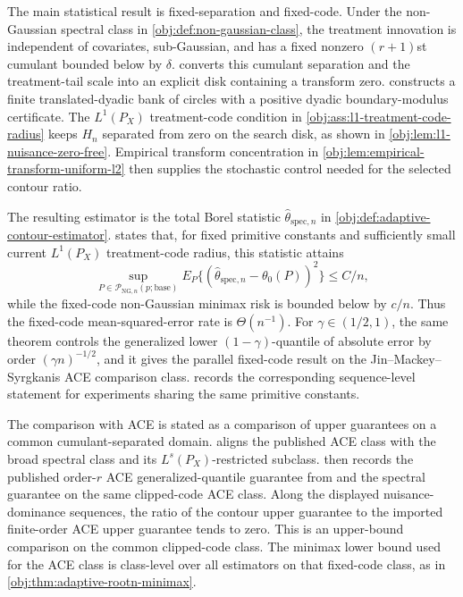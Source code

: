 The main statistical result is fixed-separation and fixed-code. Under the non-Gaussian spectral class in \cref{obj:def:non-gaussian-class}, the treatment innovation is independent of covariates, sub-Gaussian, and has a fixed nonzero \((r+1)\)st cumulant bounded below by \(\delta\).  converts this cumulant separation and the treatment-tail scale into an explicit disk containing a transform zero.  constructs a finite translated-dyadic bank of circles with a positive dyadic boundary-modulus certificate. The \(L^1(P_X)\) treatment-code condition in \cref{obj:ass:l1-treatment-code-radius} keeps \(H_n\) separated from zero on the search disk, as shown in \cref{obj:lem:l1-nuisance-zero-free}. Empirical transform concentration in \cref{obj:lem:empirical-transform-uniform-l2} then supplies the stochastic control needed for the selected contour ratio.

The resulting estimator is the total Borel statistic \(\widehat\theta_{\mathrm{spec},n}\) in \cref{obj:def:adaptive-contour-estimator}.  states that, for fixed primitive constants and sufficiently small current \(L^1(P_X)\) treatment-code radius, this statistic attains
\[
\sup_{P\in\mathcal P_{\mathrm{NG},n}(p;\mathrm{base})}
E_P\{(\widehat\theta_{\mathrm{spec},n}-\theta_0(P))^2\}
\le C/n,
\]
while the fixed-code non-Gaussian minimax risk is bounded below by \(c/n\). Thus the fixed-code mean-squared-error rate is \(\Theta(n^{-1})\). For \(\gamma\in(1/2,1)\), the same theorem controls the generalized lower \((1-\gamma)\)-quantile of absolute error by order \((\gamma n)^{-1/2}\), and it gives the parallel fixed-code result on the Jin--Mackey--Syrgkanis ACE comparison class.  records the corresponding sequence-level statement for experiments sharing the same primitive constants.

The comparison with ACE is stated as a comparison of upper guarantees on a common cumulant-separated domain.  aligns the published ACE class with the broad spectral class and its \(L^s(P_X)\)-restricted subclass.  then records the published order-\(r\) ACE generalized-quantile guarantee from \citet{JinMackeySyrgkanis2025} and the spectral guarantee on the same clipped-code ACE class. Along the displayed nuisance-dominance sequences, the ratio of the contour upper guarantee to the imported finite-order ACE upper guarantee tends to zero. This is an upper-bound comparison on the common clipped-code class. The minimax lower bound used for the ACE class is class-level over all estimators on that fixed-code class, as in \cref{obj:thm:adaptive-rootn-minimax}.

